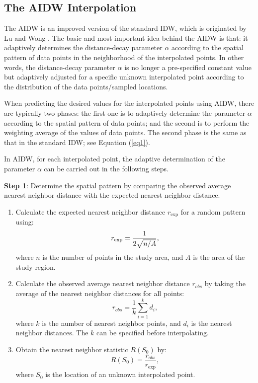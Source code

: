 \documentclass[fleqn,11pt]{wlscirep}
\begin{document}
\subsection{The AIDW Interpolation}
The AIDW is an improved version of the standard IDW, which is originated by 
Lu and Wong \cite{32}. The basic and most important idea 
behind the AIDW is that: it adaptively determines the distance-decay 
parameter $\alpha $ according to the spatial pattern of data points in the 
neighborhood of the interpolated points. In other words, the distance-decay 
parameter $\alpha $ is no longer a pre-specified constant value but 
adaptively adjusted for a specific unknown interpolated point according to 
the distribution of the data points/sampled locations.

When predicting the desired values for the interpolated points using AIDW, 
there are typically two phases: the first one is to adaptively determine the 
parameter $\alpha $ according to the spatial pattern of data points; and the 
second is to perform the weighting average of the values of data points. The 
second phase is the same as that in the standard IDW; see Equation (\ref{eq1}).

In AIDW, for each interpolated point, the adaptive determination of the 
parameter $\alpha $ can be carried out in the following steps.

\textbf{Step 1}: Determine the spatial pattern by comparing the observed 
average nearest neighbor distance with the expected nearest neighbor 
distance.

\begin{enumerate}[label=\arabic{*})]
	\item Calculate the expected nearest neighbor distance $r_{\exp } $ for a random pattern using:
\begin{equation}
\label{eq2}
r_{\exp } =\frac{1}{2\sqrt {n \mathord{\left/ {\vphantom {n A}} \right. 
			\kern-\nulldelimiterspace} A} },
\end{equation}
where $n$ is the number of points in the study area, and $A$ is the area of the 
study region.

	\item Calculate the observed average nearest neighbor distance $r_{obs} $ by taking the average of the nearest neighbor distances for all points:
\begin{equation}
\label{eq3}
r_{obs} =\frac{1}{k}\sum\limits_{i=1}^k {d_i } ,
\end{equation}
where $k$ is the number of nearest neighbor points, and $d_i $ is the 
nearest neighbor distances. The $k$ can be specified before interpolating.

	\item Obtain the nearest neighbor statistic $R\left( {S_0 } \right)$ by:
\begin{equation}
\label{eq4}
R\left( {S_0 } \right)=\frac{r_{obs} }{r_{\exp } },
\end{equation}
where $S_{0 }$ is the location of an unknown interpolated point.
\end{enumerate}
\end{document}

